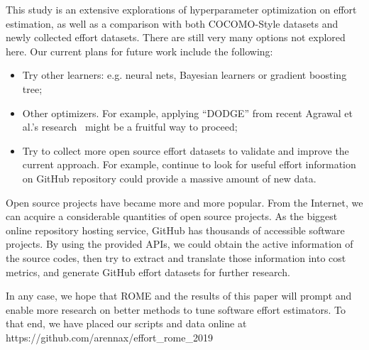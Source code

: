 \documentclass[sigconf,review,anonymous]{acmart}
\newcommand{\bi}{\begin{itemize}}
\newcommand{\ei}{\end{itemize}}
\begin{document}
This study is an extensive explorations of hyperparameter optimization on effort estimation, as well as a comparison with both COCOMO-Style datasets and newly collected effort datasets. There are still very many
options not explored here. Our current
plans for future work include the following:

\bi
\item Try other learners:
e.g. neural nets, Bayesian learners or gradient boosting tree;
\item Other optimizers. For example,
applying ``DODGE'' from recent Agrawal et al.'s research~\cite{agrawal2019dodge} might be a fruitful way to proceed;
\item Try to collect more open source effort datasets to validate and improve the current approach. For example, continue to look for useful effort information on GitHub repository could provide a massive amount of new data.
\ei
Open source projects have became more and more popular. From the Internet, we can acquire a considerable quantities of open source projects. As the biggest online repository hosting service, GitHub has thousands of accessible software projects. By using the provided APIs, we could obtain the active information of the source codes, then try to extract and translate those information into cost metrics, and generate GitHub effort datasets for further research.

In any case, we  hope  that ROME  and the results of this paper will  prompt  and  enable
more research on better methods to tune software effort
estimators.
To that end, we have placed our scripts and data online at https://github.com/arennax/effort\_rome\_2019



\end{document}
